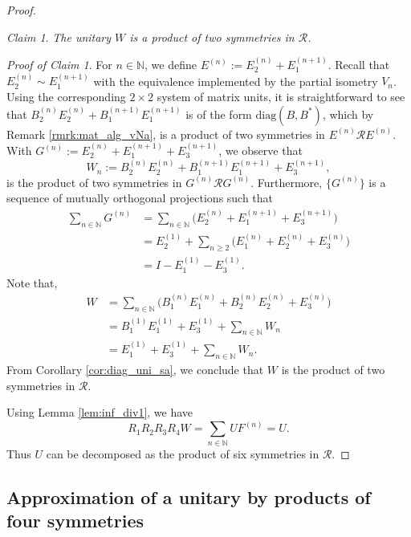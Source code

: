 \documentclass[12pt, preprint]{amsart}
\newcommand{\N}{\mathbb{N}}
\theoremstyle{definition}
\theoremstyle{remark}
\numberwithin{equation}{section}
\theoremstyle{ser}
\newtheorem{claim}{Claim}
\theoremstyle{serr}
\newtheorem{claimpff}{Proof of Claim}
\theoremstyle{ser}
\begin{document}
\begin{proof}
\begin{claim}
\textsl{
The unitary $W$ is a product of two symmetries in $\mathscr{R}$.
}
\end{claim}
\begin{claimpff}
For $n \in \N$, we define $E^{(n)} := E_2 ^{(n)} + E_1 ^{(n+1)}$. Recall that $E_2 ^{(n)} \sim E_1 ^{(n+1)}$ with the equivalence implemented by the partial isometry $V_n$. Using the corresponding $2 \times 2$ system of matrix units, it is straightforward to see that $B_2 ^{(n)} E_2 ^{(n)} + B_1^{(n+1)} E_1 ^{(n+1)}$ is of the form $\mathrm{diag}(B, B^*)$, which by Remark \ref{rmrk:mat_alg_vNa}, is a product of two symmetries in $E^{(n)} \mathscr{R} E^{(n)}$. With $G^{(n)} := E_2 ^{(n)} + E_1 ^{(n+1)} + E_3 ^{(n+1)}$, we observe that $$W_n := B_2 ^{(n)} E_2 ^{(n)} + B_1^{(n+1)} E_1 ^{(n+1)} + E_3 ^{(n+1)},$$ is the product of two symmetries in $G^{(n)} \mathscr{R} G^{(n)}$. Furthermore, $\{ G^{(n)} \}$ is a sequence of mutually orthogonal projections such that 
\begin{align*}
\sum_{n \in \N} G^{(n)} &= \sum_{n \in \N} \big( E_2 ^{(n)} + E_1 ^{(n+1)} + E_3 ^{(n+1)} \big)\\
&= E_2 ^{(1)} + \sum_{n \ge 2} \big( E_1 ^{(n)} + E_2 ^{(n)} + E_3 ^{(n)} \big) \\
&= I - E_1^{(1)} - E_3 ^{(1)}.    
\end{align*}
Note that, 
\begin{align*}
    W &= \sum_{n \in \N} \big( B_1 ^{(n)} E_1^{(n)} +  B_2^{(n)}E_2^{(n)} + E_3 ^{(n)} \big)\\
    &= B_1 ^{(1)} E_1 ^{(1)} + E_3 ^{(1)} + \sum_{n \in \N} W_n\\
    &= E_1 ^{(1)} + E_3 ^{(1)}  + \sum_{n \in \N} W_n.
\end{align*}
From Corollary \ref{cor:diag_uni_sa}, we conclude that $W$ is the product of two symmetries in $\mathscr{R}$.
\end{claimpff}
Using Lemma \ref{lem:inf_div1}, we have $$R_1 R_2 R_3 R_4 W = \sum_{n \in \N} UF^{(n)} = U.$$ Thus $U$ can be decomposed as the product of six symmetries in $\mathscr{R}$.
\end{proof}

\subsection{Approximation of a unitary by products of four symmetries}
\end{document}
